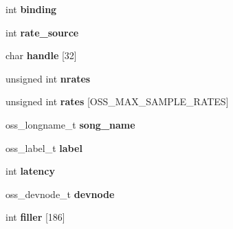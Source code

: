 \begin{DoxyCompactItemize}
\item 
int {\bfseries binding}\hypertarget{structoss__audioinfo_a7c0023ca7dd6705a3bbb38960b45bcf0}{}\label{structoss__audioinfo_a7c0023ca7dd6705a3bbb38960b45bcf0}

\item 
int {\bfseries rate\+\_\+source}\hypertarget{structoss__audioinfo_a519881ec5676e69ec40a26232fe5f009}{}\label{structoss__audioinfo_a519881ec5676e69ec40a26232fe5f009}

\item 
char {\bfseries handle} \mbox{[}32\mbox{]}\hypertarget{structoss__audioinfo_a7d875123e47bfc43c975a35d40037911}{}\label{structoss__audioinfo_a7d875123e47bfc43c975a35d40037911}

\item 
unsigned int {\bfseries nrates}\hypertarget{structoss__audioinfo_ae2602fd71e04e22a3ab97905e25f93d6}{}\label{structoss__audioinfo_ae2602fd71e04e22a3ab97905e25f93d6}

\item 
unsigned int {\bfseries rates} \mbox{[}O\+S\+S\+\_\+\+M\+A\+X\+\_\+\+S\+A\+M\+P\+L\+E\+\_\+\+R\+A\+T\+ES\mbox{]}\hypertarget{structoss__audioinfo_aee6b85810eb9aeec067b9a4b593f4a8d}{}\label{structoss__audioinfo_aee6b85810eb9aeec067b9a4b593f4a8d}

\item 
oss\+\_\+longname\+\_\+t {\bfseries song\+\_\+name}\hypertarget{structoss__audioinfo_a13b2818bfb74ba4811b0d73a18b4c050}{}\label{structoss__audioinfo_a13b2818bfb74ba4811b0d73a18b4c050}

\item 
oss\+\_\+label\+\_\+t {\bfseries label}\hypertarget{structoss__audioinfo_aa56f77606dbb4c626c7a86d5e7a67f89}{}\label{structoss__audioinfo_aa56f77606dbb4c626c7a86d5e7a67f89}

\item 
int {\bfseries latency}\hypertarget{structoss__audioinfo_a34c93c30009fea3ed81989a6c747bc2b}{}\label{structoss__audioinfo_a34c93c30009fea3ed81989a6c747bc2b}

\item 
oss\+\_\+devnode\+\_\+t {\bfseries devnode}\hypertarget{structoss__audioinfo_ad5e6a117c88c3a067b1d45d0537f3ce6}{}\label{structoss__audioinfo_ad5e6a117c88c3a067b1d45d0537f3ce6}

\item 
int {\bfseries filler} \mbox{[}186\mbox{]}\hypertarget{structoss__audioinfo_a998c188b217ac7aff37ecb4488dda178}{}\label{structoss__audioinfo_a998c188b217ac7aff37ecb4488dda178}

\end{DoxyCompactItemize}


